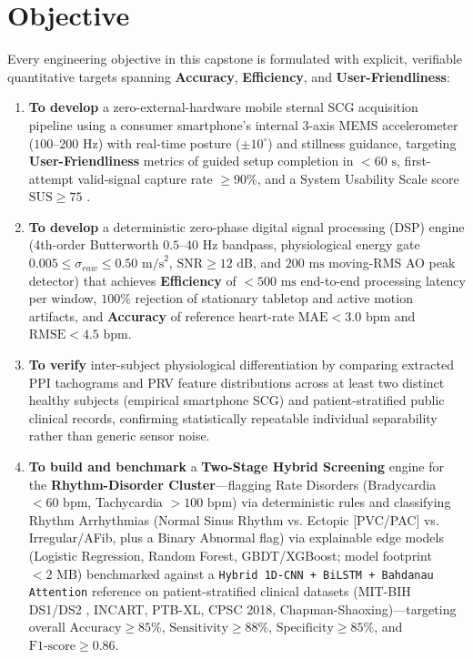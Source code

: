 \section{Objective}
Every engineering objective in this capstone is formulated with explicit, verifiable quantitative targets spanning \textbf{Accuracy}, \textbf{Efficiency}, and \textbf{User-Friendliness}:
\begin{enumerate}
	\item \textbf{To develop} a zero-external-hardware mobile sternal SCG acquisition pipeline using a consumer smartphone's internal 3-axis MEMS accelerometer ($100\text{--}200\text{ Hz}$) with real-time posture ($\pm 10^\circ$) and stillness guidance, targeting \textbf{User-Friendliness} metrics of guided setup completion in $< 60\text{ s}$, first-attempt valid-signal capture rate $\ge 90\%$, and a System Usability Scale score $\text{SUS} \ge 75$ \cite{brooke1996sus}.
	\item \textbf{To develop} a deterministic zero-phase digital signal processing (DSP) engine (4th-order Butterworth $0.5\text{--}40\text{ Hz}$ bandpass, physiological energy gate $0.005 \le \sigma_{raw} \le 0.50\text{ m/s}^2$, $\text{SNR} \ge 12\text{ dB}$, and $200\text{ ms}$ moving-RMS AO peak detector) that achieves \textbf{Efficiency} of $< 500\text{ ms}$ end-to-end processing latency per window, $100\%$ rejection of stationary tabletop and active motion artifacts, and \textbf{Accuracy} of reference heart-rate $\text{MAE} < 3.0\text{ bpm}$ and $\text{RMSE} < 4.5\text{ bpm}$.
	\item \textbf{To verify} inter-subject physiological differentiation by comparing extracted PPI tachograms and PRV feature distributions across at least two distinct healthy subjects (empirical smartphone SCG) and patient-stratified public clinical records, confirming statistically repeatable individual separability rather than generic sensor noise.
	\item \textbf{To build and benchmark} a \textbf{Two-Stage Hybrid Screening} engine for the \textbf{Rhythm-Disorder Cluster}---flagging Rate Disorders (Bradycardia $< 60\text{ bpm}$, Tachycardia $> 100\text{ bpm}$) via deterministic rules and classifying Rhythm Arrhythmias (Normal Sinus Rhythm vs. Ectopic [PVC/PAC] vs. Irregular/AFib, plus a Binary Abnormal flag) via explainable edge models (Logistic Regression, Random Forest, GBDT/XGBoost; model footprint $< 2\text{ MB}$) benchmarked against a \texttt{Hybrid 1D-CNN + BiLSTM + Bahdanau Attention} reference on patient-stratified clinical datasets (MIT-BIH DS1/DS2 \cite{goldberger2000physiobank, dechazal2004automatic}, INCART, PTB-XL, CPSC 2018, Chapman-Shaoxing)---targeting overall $\text{Accuracy} \ge 85\%$, $\text{Sensitivity} \ge 88\%$, $\text{Specificity} \ge 85\%$, and $\text{F1-score} \ge 0.86$.

\end{enumerate}
